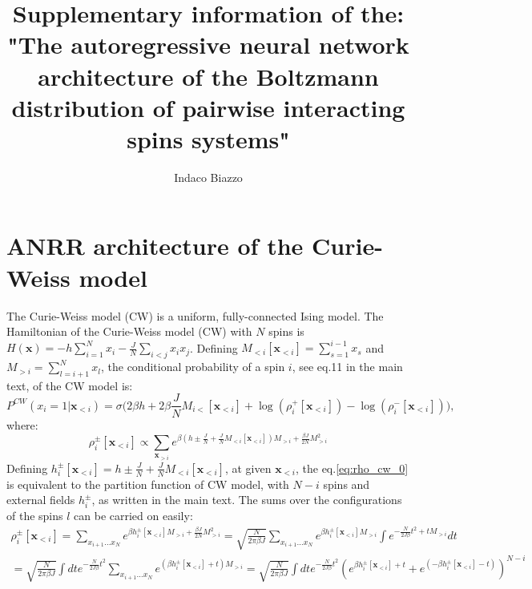 \documentclass[10pt, notitlepage]{revtex4-2}
\begin{document}
\title{Supplementary information of the: "The autoregressive neural network architecture of the Boltzmann distribution of pairwise interacting spins systems"}

\author{Indaco Biazzo}
\maketitle
\tableofcontents

\section{ANRR architecture of the Curie-Weiss model}

The Curie-Weiss model (CW) is a uniform, fully-connected Ising model. The Hamiltonian of the Curie-Weiss model (CW) with $N$ spins is $H\left(\mathbf{x}\right)=-h\sum_{i=1}^{N}x_{i}-\frac{J}{N}\sum_{i<j}x_{i}x_{j}$. Defining $M_{<i}[\mathbf{x}_{<i}]=\sum_{s=1}^{i-1}x_{s}$ and $M_{>i}=\sum_{l=i+1}^{N}x_{l}$, the conditional probability of a spin $i$, see eq.11 in the main text, of the CW model is:
\begin{equation}
P^{CW}\left(x_{i}=1|\mathbf{x}_{<i}\right) = 
\sigma\bigg( 
 2 \beta h + 2 \beta \frac{J}{N}M_{i<}[\mathbf{x}_{<i}] + %
 \log(\rho_i^+[\mathbf{x}_{<i}]) - \log(\rho_i^-[\mathbf{x}_{<i}])
\bigg),
\label{eq:conditional_cw}
\end{equation}
where:
\begin{equation}
\rho_i^{\pm}[\mathbf{x}_{<i}] \propto \sum_{\mathbf{x}_{>i}}e^{\beta \left(h\pm\frac{J}{N}+\frac{J}{N}M_{<i}[\mathbf{x}_{<i}]\right)M_{>i}+\frac{\beta J}{2N}M_{>i}^{2}} 
\label{eq:rho_cw_0}
\end{equation}
Defining $h_i^{\pm}[\mathbf{x}_{<i}] =h\pm\frac{J}{N}+\frac{J}{N}M_{<i}[\mathbf{x}_{<i}]$, at given $\mathbf{x}_{<i}$, the eq.\ref{eq:rho_cw_0} is equivalent to the partition function of CW model, with $N-i$ spins and external fields $h_i^{\pm}$, as written in the main text. 
The sums over the configurations of the spins $l$ can be carried on easily: 
\begin{multline}
 \rho_i^{\pm}[\mathbf{x}_{<i}] = \sum_{x_{i+1}\dots x_{N}} e^{\beta h_i^{\pm}[\mathbf{x}_{<i}]M_{>i} +\frac{\beta J}{2N}M_{>i}^{2}} = \sqrt{\frac{N}{2\pi \beta J}}\sum_{x_{i+1}\dots x_{N}}e^{\beta h_i^{\pm}[\mathbf{x}_{<i}] M_{>i}}\int e^{-\frac{N}{2J \beta}t^{2}+t M_{>i}} dt\\
  = \sqrt{\frac{N}{2\pi \beta J}}\int dt e^{-\frac{N}{2J \beta}t^{2}} \sum_{x_{i+1}\dots x_{N}}e^{(\beta h_i^{\pm}[\mathbf{x}_{<i}] + t) M_{>i}}  
 =  \sqrt{\frac{N}{2\pi \beta J}}\int dt e^{-\frac{N}{2J \beta}t^{2}} \left(e^{\beta h_i^{\pm}[\mathbf{x}_{<i}] + t} + e^{ (-\beta h_i^{\pm}[\mathbf{x}_{<i}] - t)} \right)^{N-i}  \\ 
 \label{eq:rho_last_exact}
 \end{multline} 
\end{document}
